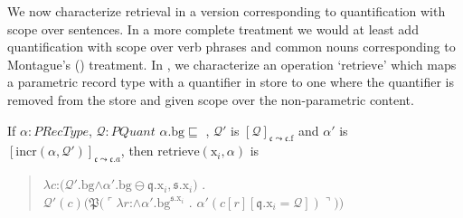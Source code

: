 We now characterize retrieval in a version corresponding to
quantification with scope over sentences.  In a more complete
treatment we would at least add quantification with scope over verb phrases
and common nouns corresponding to Montague's (\citeyear{Montague1973})
treatment.  In \nexteg{}, we characterize an operation
`$\mathrm{retrieve}$' which maps a parametric record type with a
quantifier in store to one where the quantifier is removed from the
store and given scope over the non-parametric content.

\begin{ex} 




  If $\alpha:\textit{PRecType}$, $\mathcal{Q}:\textit{PQuant}$ 
  $\alpha.\text{bg}\sqsubseteq$ , $\mathcal{Q}'$ is
$[\mathcal{Q}]_{\mathfrak{c}\leadsto\mathfrak{c}.\text{f}}$ and
$\alpha'$ is
$[\mathrm{incr}(\alpha,\mathcal{Q}')]_{\mathfrak{c}\leadsto\mathfrak{c}.a}$, then
  $\mathrm{retrieve}(\text{x}_i,\alpha)$ is
  \begin{quote}
    $\lambda
    c$:$(\mathcal{Q}'.\text{bg}$\d{$\wedge$}$\alpha'.\text{bg}\ominus\mathfrak{q}.\text{x}_i,\mathfrak{s}.\text{x}_i)$
    . \\ \hspace*{2em}$\mathcal{Q'}(c)(\mathfrak{P}(\ulcorner\lambda
    r$:\d{$\wedge$}$\alpha'.\text{bg}^{\mathfrak{s}.\text{x}_i}$
    . $\alpha'(c[r][\mathfrak{q}.\text{x}_i=\mathcal{Q}])\urcorner))$
  \end{quote}
  
\end{ex}

